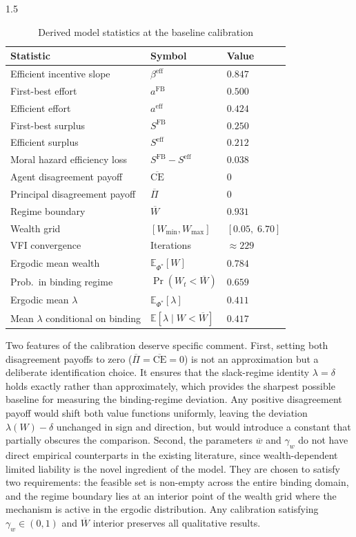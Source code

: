 \documentclass[12pt]{article}
\theoremstyle{definition}
\theoremstyle{plain}
\begin{document}
\begin{spacing}{1.5}
\begin{table}[htbp]
\centering
\caption{Derived model statistics at the baseline calibration}
\label{tab:derived}
\begin{tabular}{lll}
\toprule
Statistic & Symbol & Value \\
\midrule
Efficient incentive slope & $\beta^{\mathrm{eff}}$ & $0.847$ \\
First-best effort & $a^{\mathrm{FB}}$ & $0.500$ \\
Efficient effort & $a^{\mathrm{eff}}$ & $0.424$ \\
First-best surplus & $S^{\mathrm{FB}}$ & $0.250$ \\
Efficient surplus & $S^{\mathrm{eff}}$ & $0.212$ \\
Moral hazard efficiency loss & $S^{\mathrm{FB}} - S^{\mathrm{eff}}$ & $0.038$ \\
Agent disagreement payoff & $\overline{\text{CE}}$ & $0$ \\
Principal disagreement payoff & $\overline{\Pi}$ & $0$ \\
Regime boundary & $\overline{W}$ & $0.931$ \\
Wealth grid & $[W_{\min}, W_{\max}]$ & $[0.05,\;6.70]$ \\
VFI convergence & Iterations & $\approx 229$ \\
Ergodic mean wealth & $\mathbb{E}_{\Phi^*}[W]$ & $0.784$ \\
Prob.\ in binding regime & $\Pr(W_t < \overline{W})$ & $0.659$ \\
Ergodic mean $\lambda$ & $\mathbb{E}_{\Phi^*}[\lambda]$ & $0.411$ \\
Mean $\lambda$ conditional on binding & $\mathbb{E}[\lambda \mid W < \overline{W}]$ & $0.417$ \\
\bottomrule
\end{tabular}
\end{table}
 
Two features of the calibration deserve specific comment. First, setting both disagreement payoffs to zero ($\overline{\Pi} = \overline{\text{CE}} = 0$) is not an approximation but a deliberate identification choice. It ensures that the slack-regime identity $\lambda = \delta$ holds exactly rather than approximately, which provides the sharpest possible baseline for measuring the binding-regime deviation. Any positive disagreement payoff would shift both value functions uniformly, leaving the deviation $\lambda(W) - \delta$ unchanged in sign and direction, but would introduce a constant that partially obscures the comparison. Second, the parameters $\overline{w}$ and $\gamma_w$ do not have direct empirical counterparts in the existing literature, since wealth-dependent limited liability is the novel ingredient of the model. They are chosen to satisfy two requirements: the feasible set is non-empty across the entire binding domain, and the regime boundary lies at an interior point of the wealth grid where the mechanism is active in the ergodic distribution. Any calibration satisfying $\gamma_w \in (0,1)$ and $\overline{W}$ interior preserves all qualitative results.
 

\end{spacing}
\end{document}

